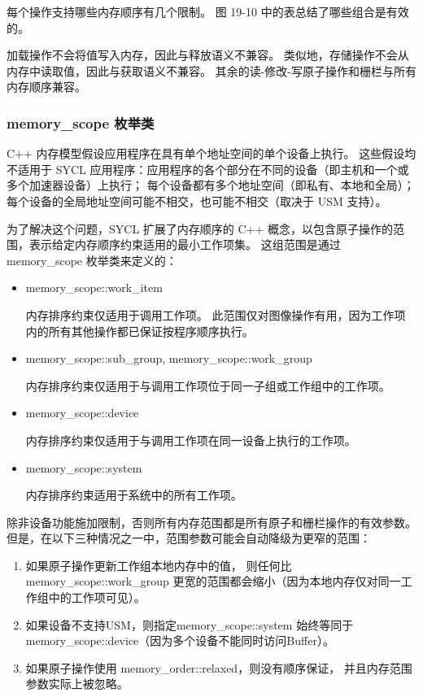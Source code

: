 每个操作支持哪些内存顺序有几个限制。 图 19-10 中的表总结了哪些组合是有效的。

加载操作不会将值写入内存，因此与释放语义不兼容。 类似地，存储操作不会从内存中读取值，因此与获取语义不兼容。 
其余的读-修改-写原子操作和栅栏与所有内存顺序兼容。

\subsubsection{memory\_scope 枚举类}
C++ 内存模型假设应用程序在具有单个地址空间的单个设备上执行。 
这些假设均不适用于 SYCL 应用程序：应用程序的各个部分在不同的设备（即主机和一个或多个加速器设备）上执行； 
每个设备都有多个地址空间（即私有、本地和全局）； 
每个设备的全局地址空间可能不相交，也可能不相交（取决于 USM 支持）。

为了解决这个问题，SYCL 扩展了内存顺序的 C++ 概念，以包含原子操作的范围，表示给定内存顺序约束适用的最小工作项集。 
这组范围是通过 memory\_scope 枚举类来定义的：

\begin{itemize}
	\item memory\_scope::work\_item

内存排序约束仅适用于调用工作项。 此范围仅对图像操作有用，因为工作项内的所有其他操作都已保证按程序顺序执行。

	\item memory\_scope::sub\_group, memory\_scope::work\_group

内存排序约束仅适用于与调用工作项位于同一子组或工作组中的工作项。

	\item memory\_scope::device

内存排序约束仅适用于与调用工作项在同一设备上执行的工作项。

	\item memory\_scope::system

内存排序约束适用于系统中的所有工作项。
\end{itemize}

除非设备功能施加限制，否则所有内存范围都是所有原子和栅栏操作的有效参数。 
但是，在以下三种情况之一中，范围参数可能会自动降级为更窄的范围：

\begin{enumerate}
	\item 如果原子操作更新工作组本地内存中的值，
	则任何比 memory\_scope::work\_group 更宽的范围都会缩小（因为本地内存仅对同一工作组中的工作项可见）。

	\item 如果设备不支持USM，则指定memory\_scope::system 
	始终等同于memory\_scope::device（因为多个设备不能同时访问Buffer）。

	\item 如果原子操作使用 memory\_order::relaxed，则没有顺序保证，
	并且内存范围参数实际上被忽略。
\end{enumerate}

